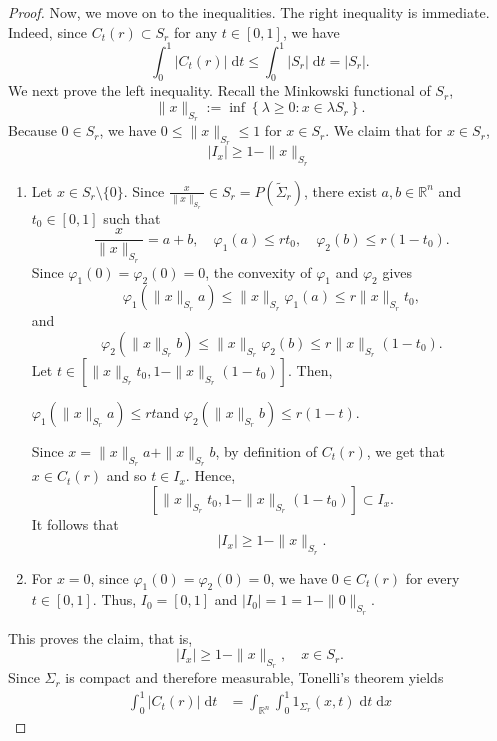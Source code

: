 \documentclass[10pt,a4paper]{amsart}
\newcommand{\R}{{\mathbb R}}
\begin{document}
\begin{proof}
    Now, we move on to the inequalities. The right inequality is immediate. Indeed, since $C_t(r) \subset S_r$ for any $t \in [0,1]$, we have
    \[
        \int_0^1\left|C_t(r)\right| \;\mathrm d t
        \leq
        \int_0^1\left|S_r\right| \;\mathrm d t
        =
        \left|S_r\right|.
    \]
    We next prove the left inequality. Recall the Minkowski functional of $S_r$,
    $$
    \|x\|_{S_r}:=\inf \left\{\lambda \geq 0: x \in \lambda S_r\right\}.
    $$
    Because $0 \in S_r$, we have $0 \leq \|x\|_{S_r} \leq 1$ for $x \in S_r$. We claim that for $x \in S_r$,
    \[
        |I_x| \geq 1-\|x\|_{S_r}
    \]
   \begin{enumerate}[wide =0pt, labelwidth= .9cm, leftmargin=1.55cm, label=\textbf{Case \arabic*}:]
        \item Let $x \in S_r \setminus\{0\}$. Since  $\frac{x}{\|x\|_{S_r}} \in S_r = P\left(\widetilde{\Sigma}_r\right)$, there exist $a,b \in \R^n$ and $t_0 \in [0,1]$ such that
    \[
        \frac{x}{\|x\|_{S_r}}=a+b, \quad \varphi_1(a) \leq r t_0, \quad \varphi_2(b) \leq r\left(1-t_0\right).
    \]
    Since $\varphi_1(0)=\varphi_2(0)=0$, the convexity of $\varphi_1$ and $\varphi_2$ gives
    $$
    \varphi_1(\|x\|_{S_r} a) \leq \|x\|_{S_r} \varphi_1(a) \leq r \|x\|_{S_r} t_0
    , $$
    and
    $$
    \varphi_2(\|x\|_{S_r} b) \leq \|x\|_{S_r} \varphi_2(b) \leq r \|x\|_{S_r}\left(1-t_0\right) .
    $$
    Let $t \in\left[\|x\|_{S_r} t_0, 1-\|x\|_{S_r}\left(1-t_0\right)\right]$. Then,
    \begin{center}
        $\varphi_1(\|x\|_{S_r} a) \leq rt$\quad and \quad$ \varphi_2(\|x\|_{S_r} b) \leq r \left(1-t\right)$.
    \end{center}
    Since $x = \|x\|_{S_r}a+\|x\|_{S_r}b$, by definition of $C_t(r)$, we get that $x \in C_t(r)$ and so $t \in I_x$. Hence,
    \[
        \left[\|x\|_{S_r} t_0, 1-\|x\|_{S_r}\left(1-t_0\right)\right] \subset I_x.
    \]
    It follows that
    \[
        |I_x| \geq 1-\|x\|_{S_r}.
    \]
    \item For $x=0$, since $\varphi_1(0)=\varphi_2(0)=0$, we have $0 \in C_t(r)$ for every $t \in[0,1]$. Thus,
$
I_0=[0,1]
$
and
$
\left|I_0\right|=1=1-\|0\|_{S_r} .
$
    \end{enumerate}
This proves the claim, that is,
$$
\left|I_x\right| \geq 1-\|x\|_{S_r}, \quad x \in S_r.
$$
Since $\Sigma_r$ is compact and therefore measurable, Tonelli's theorem yields
$$
\begin{aligned}
\int_0^1\left|C_t(r)\right|  \;\mathrm{d} t
& =\int_{\mathbb{R}^n} \int_0^1 {1}_{\Sigma_r}(x, t) \;\mathrm{d} t \;\mathrm{d} x

\end{aligned}$$
\end{proof}
\end{document}
